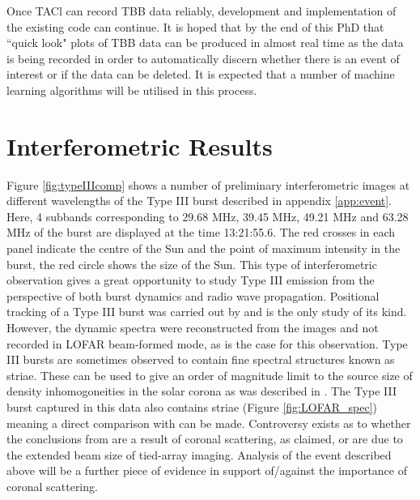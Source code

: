 Once TACl can record TBB data reliably, development and implementation of the existing code can continue. It is hoped that by the end of this PhD that ``quick look" plots of TBB data can be produced in almost real time as the data is being recorded in order to automatically discern whether there is an event of interest or if the data can be deleted. It is expected that a number of machine learning algorithms will be utilised in this process.

\section{Interferometric Results}
Figure \ref{fig:typeIIIcomp} shows a number of preliminary interferometric images at different wavelengths of the Type III burst described in appendix \ref{app:event}. Here, 4 subbands corresponding to 29.68 MHz, 39.45 MHz, 49.21 MHz and 63.28 MHz of the burst are displayed at the time 13:21:55.6. The red crosses in each panel indicate the centre of the Sun and the point of maximum intensity in the burst, the red circle shows the size of the Sun.
This type of interferometric observation gives a great opportunity to study Type III emission from the perspective of both burst dynamics and radio wave propagation. Positional tracking of a Type III burst was carried out by \cite{Mann2018} and is the only study of its kind. However, the dynamic spectra were reconstructed from the images and not recorded in LOFAR beam-formed mode, as is the case for this observation. %
Type III bursts are sometimes observed to contain fine spectral structures known as striae. These can be used to give an order of magnitude limit to the source size of density inhomogoneities in the solar corona as was described in \cite{Kontar2017}. 
The Type III burst captured in this data also contains striae (Figure \ref{fig:LOFAR_spec}) meaning a direct comparison with \cite{Kontar2017} can be made. Controversy exists as to whether the conclusions from \cite{Kontar2017} are a result of coronal scattering, as claimed, or are due to the extended beam size of tied-array imaging. Analysis of the event described above will be a further piece of evidence in support of/against the importance of coronal scattering.



